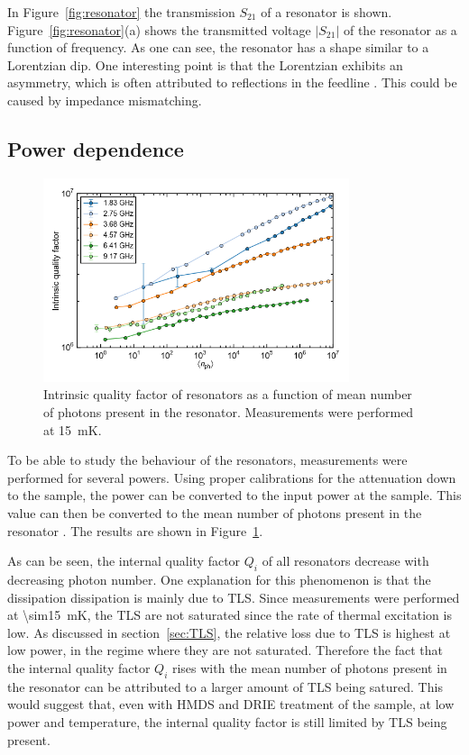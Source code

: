  In Figure~\ref{fig:resonator} the transmission $S_{21}$ of a resonator is shown. Figure~\ref{fig:resonator}(a) shows the transmitted voltage $|S_{21}|$ of the resonator as a function of frequency. As one can see, the resonator has a shape similar to a Lorentzian dip. One interesting point is that the Lorentzian exhibits an asymmetry, which is often attributed to reflections in the feedline \cite[p.~192]{Geerlings}. This could be caused by impedance mismatching.


\subsection{Power dependence}
\label{sec:resonator:results:power_dependence}

\begin{figure}
    \centering
    \includegraphics[width=0.8\textwidth]{Figures/DRIE/Qi_vs_n_photon.png}
    \caption{Intrinsic quality factor of resonators as a function of mean number of photons present in the resonator. Measurements were performed at \SI{15}{\milli \kelvin}.}
    \label{fig:Qi_vs_n_photon}
\end{figure}
To be able to study the behaviour of the resonators, measurements were performed for several powers. Using proper calibrations for the attenuation down to the sample, the power can be converted to the input power at the sample. This value can then be converted to the mean number of photons present in the resonator \cite{DRIE}. The results are shown in Figure~\ref{fig:Qi_vs_n_photon}.

As can be seen, the internal quality factor $Q_i$ of all resonators decrease with decreasing photon number. One explanation for this phenomenon is that the dissipation dissipation is mainly due to TLS. Since measurements were performed at \SI{\sim15}{mK}, the TLS are not saturated since the rate of thermal excitation is low. As discussed in section~\ref{sec:TLS}, the relative loss due to TLS is highest at low power, in the regime where they are not saturated. Therefore the fact that the internal quality factor $Q_i$ rises with the mean number of photons present in the resonator can be attributed to a larger amount of TLS being satured. This would suggest that, even with HMDS and DRIE treatment of the sample, at low power and temperature, the internal quality factor is still limited by TLS being present.


